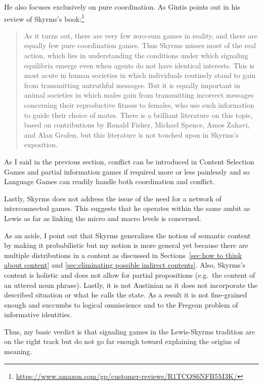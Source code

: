 He also focuses exclusively on pure coordination. As Gintis points out in his review of Skyrms's book:\footnote{\url{https://www.amazon.com/gp/customer-reviews/R1TCQS6NFB5M3K/}}

\begin{quote}

As it turns out, there are very few zero-sum games in reality, and there are equally few pure coordination games. Thus Skyrms misses most of the real action, which lies in understanding the conditions under which signaling equilibria emerge even when agents do not have identical interests. This is most acute in human societies in which individuals routinely stand to gain from transmitting untruthful messages. But it is equally important in animal societies in which males gain from transmitting incorrect messages concerning their reproductive fitness to females, who use such information to guide their choice of mates. There is a brilliant literature on this topic, based on contributions by Ronald Fisher, Michael Spence, Amos Zahavi, and Alan Grafen, but this literature is not touched upon in Skyrms's exposition.

\end{quote}

As I said in the previous section, conflict can be introduced in Content Selection Games and partial information games if required more or less painlessly and so Language Games can readily handle both coordination and conflict.

Lastly, Skyrms does not address the issue of the need for a network of interconnected games. This suggests that he operates within the same ambit as Lewis as far as linking the micro and macro levels is concerned.

As an aside, I point out that Skyrms generalizes the notion of semantic content by making it probabilistic but my notion is more general yet because there are multiple distributions in a content as discussed in Sections~\ref{sec:how to think about content} and \ref{sec:eliminating possible indirect contents}. Also, Skyrms's content is holistic and does not allow for partial propositions (e.g.\ the content of an uttered noun phrase). Lastly, it is not Austinian as it does not incorporate the described situation or what he calls the state. As a result it is not fine-grained enough and succumbs to logical omniscience and to the Fregean problem of informative identities.

Thus, my basic verdict is that signaling games in the Lewis-Skyrms tradition are on the right track but do not go far enough toward explaining the origins of meaning.

